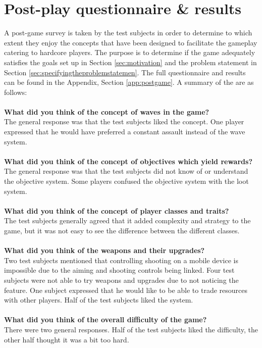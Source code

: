 \section{Post-play questionnaire \& results}\label{test:results}
A post-game survey is taken by the test subjects in order to determine to which extent they enjoy the concepts that have been designed to facilitate the gameplay catering to hardcore players.
The purpose is to determine if the game adequately satisfies the goals set up in Section \ref{sec:motivation} and the problem statement in Section \ref{sec:specifyingtheproblemstatemen}.
The full questionnaire and results can be found in the Appendix, Section \ref{app:postgame}.
A summary of the are as follows:\\\\
\textbf{What did you think of the concept of waves in the game?}\\
The general response was that the test subjects liked the concept.
One player expressed that he would have preferred a constant assault instead of the wave system.\\\\
\textbf{What did you think of the concept of objectives which yield rewards?}\\
The general response was that the test subjects did not know of or understand the objective system.
Some players confused the objective system with the loot system.\\\\
\textbf{What did you think of the concept of player classes and traits?}\\
The test subjects generally agreed that it added complexity and strategy to the game, but it was not easy to see the difference between the different classes.\\\\
\textbf{What did you think of the weapons and their upgrades?}\\
Two test subjects mentioned that controlling shooting on a mobile device is impossible due to the aiming and shooting controls being linked.
Four test subjects were not able to try weapons and upgrades due to not noticing the feature.
One subject expressed that he would like to be able to trade resources with other players.
Half of the test subjects liked the system.\\\\
\textbf{What did you think of the overall difficulty of the game?}\\
There were two general responses.
Half of the test subjects liked the difficulty, the other half thought it was a bit too hard.
